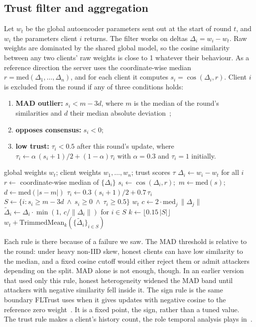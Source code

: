 \subsection{Trust filter and aggregation}
\label{sec:filter}
Let $w_t$ be the global autoencoder parameters sent out at the start of round $t$, and $w_i$ the parameters client $i$ returns. The filter works on deltas $\Delta_i=w_i-w_t$. Raw weights are dominated by the shared global model, so the cosine similarity between any two clients' raw weights is close to 1 whatever their behaviour. As a reference direction the server uses the coordinate-wise median $r=\mathrm{med}(\Delta_1,\dots,\Delta_n)$, and for each client it computes $s_i=\cos(\Delta_i,r)$. Client $i$ is excluded from the round if any of three conditions holds:
\begin{enumerate}
  \item \textbf{MAD outlier:} $s_i<m-3d$, where $m$ is the median of the round's similarities and $d$ their median absolute deviation~\cite{leys2013};
  \item \textbf{opposes consensus:} $s_i<0$;
  \item \textbf{low trust:} $\tau_i<0.5$ after this round's update, where $\tau_i\leftarrow\alpha\,(s_i+1)/2+(1-\alpha)\tau_i$ with $\alpha=0.3$ and $\tau_i=1$ initially.
\end{enumerate}

\begin{algorithm}[t]
\caption{One round of trust-filtered aggregation}
\label{alg:filter}
\begin{algorithmic}[1]
\Require global weights $w_t$; client weights $w_1,\dots,w_n$; trust scores $\tau$
\State $\Delta_i\gets w_i-w_t$ for all $i$
\State $r\gets$ coordinate-wise median of $\{\Delta_i\}$
\State $s_i\gets\cos(\Delta_i,r)$;\ $m\gets\mathrm{med}(s)$;\ $d\gets\mathrm{med}(|s-m|)$
\State $\tau_i\gets 0.3\,(s_i+1)/2+0.7\,\tau_i$
\State $S\gets\{i: s_i\ge m-3d\ \wedge\ s_i\ge 0\ \wedge\ \tau_i\ge 0.5\}$
 \State \Return $w_t$ \EndIf
\State $c\gets 2\cdot\mathrm{med}_j\,\lVert\Delta_j\rVert$
\State $\tilde\Delta_i\gets\Delta_i\cdot\min(1,\,c/\lVert\Delta_i\rVert)$ for $i\in S$
\State $k\gets\lfloor 0.15\,|S|\rfloor$
\State \Return $w_t+\mathrm{TrimmedMean}_k(\{\tilde\Delta_i\}_{i\in S})$
\end{algorithmic}
\end{algorithm}

Each rule is there because of a failure we saw. The MAD threshold is relative to the round: under heavy non-IID skew, honest clients can have low similarity to the median, and a fixed cosine cutoff would either reject them or admit attackers depending on the split. MAD alone is not enough, though. In an earlier version that used only this rule, honest heterogeneity widened the MAD band until attackers with negative similarity fell inside it. The sign rule is the same boundary FLTrust uses when it gives updates with negative cosine to the reference zero weight~\cite{cao2021fltrust}. It is a fixed point, the sign, rather than a tuned value. The trust rule makes a client's history count, the role temporal analysis plays in~\cite{li2021spatial}.

